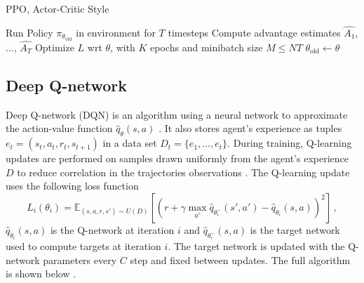 \begin{algorithm}
	\caption{PPO, Actor-Critic Style}\label{algorithm:ppo}
	\begin{algorithmic}
			\State Run Policy $\pi_{\theta_\text{old}}$ in environment for $T$ timesteps
			\State Compute advantage estimates $\hat{A_1}$, ..., $\hat{A_T}$
		\EndFor
		\State Optimize $L$ wrt $\theta$, with $K$ epochs and minibatch size $M \leq NT$
		\State $\theta_{\text{old}} \gets \theta$
	\EndFor
\end{algorithmic}
\end{algorithm}

\subsection{Deep Q-network}

Deep Q-network (DQN) is an algorithm using a neural network to approximate the action-value function $\hat{q}_\theta(s, a)$ \cite{mnih2015human}. It also stores agent's experience as tuples $e_t = (s_t, a_t, r_t, s_{t+1})$ in a data set $D_t = \{e_1, ..., e_t\}$. During training, Q-learning updates are performed on samples drawn uniformly from the agent's experience $D$ to reduce correlation in the trajectories observations \cite{mnih2015human}. The Q-learning update uses the following loss function \cite{mnih2015human}
\begin{equation} \label{equation:2.16}
	L_i(\theta_i) = \mathbb{E}_{(s,a,r,s') \sim U(D)} \left [\left ( r + \gamma \max_{a'}\hat{q}_{\theta^-_i}(s',a') -\hat{q}_{\theta_i}(s,a) \right )^2 \right ] \, ,
\end{equation}
$\hat{q}_{\theta_i}(s,a)$ is the Q-network at iteration $i$ and $\hat{q}_{\theta^-_i}(s,a)$ is the target network used to compute targets at iteration $i$. The target network is updated with the Q-network parameters every $C$ step and fixed between updates. The full algorithm is shown below \cite{mnih2015human}.

